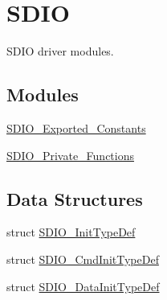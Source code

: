 \hypertarget{group___s_d_i_o}{\section{S\-D\-I\-O}
\label{group___s_d_i_o}
}


S\-D\-I\-O driver modules.  


\subsection*{Modules}
\begin{DoxyCompactItemize}
\item 
\hyperlink{group___s_d_i_o___exported___constants}{S\-D\-I\-O\-\_\-\-Exported\-\_\-\-Constants}
\item 
\hyperlink{group___s_d_i_o___private___functions}{S\-D\-I\-O\-\_\-\-Private\-\_\-\-Functions}
\end{DoxyCompactItemize}
\subsection*{Data Structures}
\begin{DoxyCompactItemize}
\item 
struct \hyperlink{struct_s_d_i_o___init_type_def}{S\-D\-I\-O\-\_\-\-Init\-Type\-Def}
\item 
struct \hyperlink{struct_s_d_i_o___cmd_init_type_def}{S\-D\-I\-O\-\_\-\-Cmd\-Init\-Type\-Def}
\item 
struct \hyperlink{struct_s_d_i_o___data_init_type_def}{S\-D\-I\-O\-\_\-\-Data\-Init\-Type\-Def}
\end{DoxyCompactItemize}
